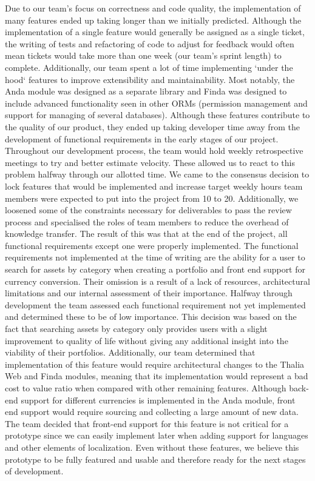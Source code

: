 \documentclass[main.tex]{subfiles}
\begin{document}
Due to our team's focus on correctness and code quality, the implementation of many features ended up taking longer than we initially predicted. Although the implementation of a single feature would generally be assigned as a single ticket, the writing of tests and refactoring of code to adjust for feedback would often mean tickets would take more than one week (our team's sprint length) to complete. Additionally, our team spent a lot of time implementing `under the hood` features to improve extensibility and maintainability. Most notably, the Anda module was designed as a separate library and Finda was designed to include advanced functionality seen in other ORMs (permission management and support for managing of several databases). Although these features contribute to the quality of our product, they ended up taking developer time away from the development of functional requirements in the early stages of our project.
Throughout our development process, the team would hold weekly retrospective meetings to try and better estimate velocity. These allowed us to react to this problem halfway through our allotted time. We came to the consensus decision to lock features that would be implemented and increase target weekly hours team members were expected to put into the project from 10 to 20. Additionally, we loosened some of the constraints necessary for deliverables to pass the review process and specialised the roles of team members to reduce the overhead of knowledge transfer. The result of this was that at the end of the project, all functional requirements except one were properly implemented.
The functional requirements not implemented at the time of writing are the ability for a user to search for assets by category when creating a portfolio and front end support for currency conversion. Their omission is a result of a lack of resources, architectural limitations and our internal assessment of their importance. Halfway through development the team assessed each functional requirement not yet implemented and determined these to be of low importance. This decision was based on the fact that searching assets by category only provides users with a slight improvement to quality of life without giving any additional insight into the viability of their portfolios. Additionally, our team determined that implementation of this feature would require architectural changes to the Thalia Web and Finda modules, meaning that its implementation would represent a bad cost to value ratio when compared with other remaining features. Although back-end support for different currencies is implemented in the Anda module, front end support would require sourcing and collecting a large amount of new data. The team decided that front-end support for this feature is not critical for a prototype since we can easily implement later when adding support for languages and other elements of localization. Even without these features, we believe this prototype to be fully featured and usable and therefore ready for the next stages of development.
\end{document}
